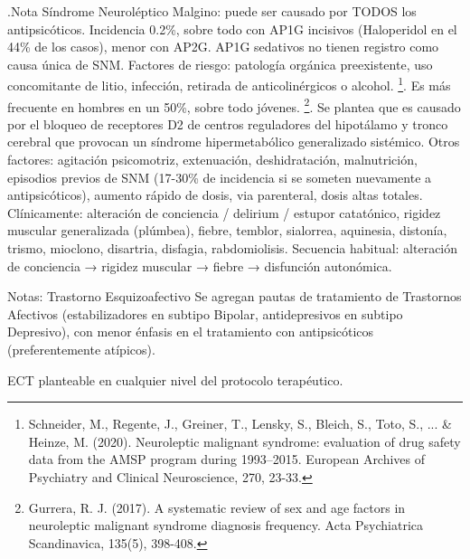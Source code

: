 .Nota
Síndrome Neuroléptico Malgino: puede ser causado por TODOS los antipsicóticos. Incidencia 0.2\%, sobre todo con AP1G incisivos (Haloperidol en el 44\% de los casos), menor con AP2G. AP1G sedativos no tienen registro como causa única de SNM. Factores de riesgo: patología orgánica preexistente, uso concomitante de litio, infección, retirada de anticolinérgicos o alcohol. \footnote{Schneider, M., Regente, J., Greiner, T., Lensky, S., Bleich, S., Toto, S., ... \& Heinze, M. (2020). Neuroleptic malignant syndrome: evaluation of drug safety data from the AMSP program during 1993–2015. European Archives of Psychiatry and Clinical Neuroscience, 270, 23-33.}. Es más frecuente en hombres en un 50\%, sobre todo jóvenes. \footnote{Gurrera, R. J. (2017). A systematic review of sex and age factors in neuroleptic malignant syndrome diagnosis frequency. Acta Psychiatrica Scandinavica, 135(5), 398-408.}. Se plantea que es causado por el bloqueo de receptores D2 de centros reguladores del hipotálamo y tronco cerebral que provocan un síndrome hipermetabólico generalizado sistémico. Otros factores: agitación psicomotriz, extenuación, deshidratación, malnutrición, episodios previos de SNM (17-30\% de incidencia si se someten nuevamente a antipsicóticos), aumento rápido de dosis, via parenteral, dosis altas totales. Clínicamente: alteración de conciencia / delirium / estupor catatónico, rigidez muscular generalizada (plúmbea), fiebre, temblor, sialorrea, aquinesia, distonía, trismo, mioclono, disartria, disfagia, rabdomiolisis. Secuencia habitual: alteración de conciencia → rigidez muscular → fiebre → disfunción autonómica.

Notas: Trastorno Esquizoafectivo Se agregan pautas de tratamiento de Trastornos Afectivos (estabilizadores en subtipo Bipolar, antidepresivos en subtipo Depresivo), con menor énfasis en el tratamiento con antipsicóticos (preferentemente atípicos).

ECT planteable en cualquier nivel del protocolo terapéutico.

